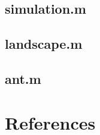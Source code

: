 \documentclass[11pt]{article}
\begin{document}
\subsection{simulation.m}

\subsection{landscape.m}

\subsection{ant.m}


\section{References}



\end{document}
